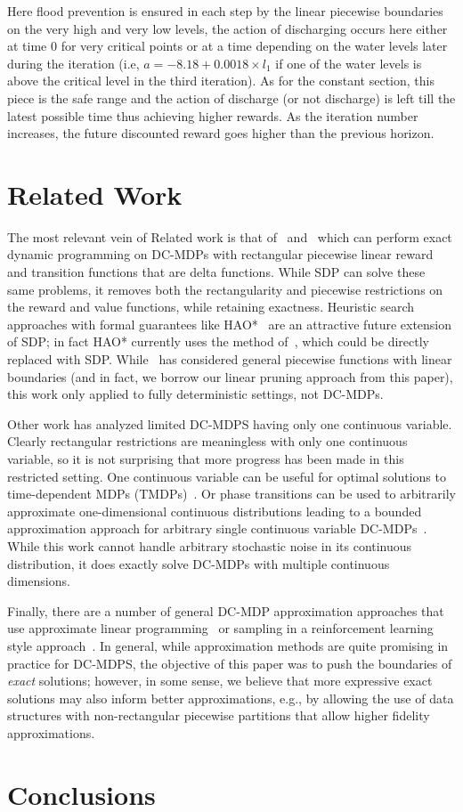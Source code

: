\documentclass[letterpaper]{article}
\begin{document}
Here flood prevention is ensured in each step by the linear piecewise
boundaries on the very high and very low levels, the action of discharging
occurs here either at time 0 for very critical points or at a time depending
on the water levels later during the iteration (i.e, $a = -8.18 +
0.0018\times l_1$ if one of the water levels is above the critical level in
the third iteration). As for the constant section, this piece is the safe
range and the action of discharge (or not discharge) is left till the latest
possible time thus achieving higher rewards. As the iteration number
increases, the future discounted reward goes higher than the previous
horizon.

\section{Related Work}
The most relevant vein of Related work is that of~\cite{feng04}
and~\cite{li05} which can perform exact dynamic programming on
DC-MDPs with rectangular piecewise linear reward and transition functions
that are delta functions.  While SDP can solve these same problems,
it removes both the rectangularity and piecewise restrictions on the
reward and value functions, while
retaining exactness.  
Heuristic search approaches with formal guarantees 
like HAO*~\cite{hao09} are an attractive future extension of SDP;
in fact HAO* currently uses the method of~\cite{feng04}, which could
be directly replaced with SDP.  While~\cite{penberthy94} has considered
general piecewise functions with linear boundaries (and in fact,
we borrow our linear pruning approach from this paper), this work
only applied to fully deterministic settings, not DC-MDPs.

Other work has analyzed limited DC-MDPS having only one continuous
variable.  Clearly rectangular restrictions are meaningless with
only one continuous variable, so it is not surprising that more
progress has been made in this restricted setting.  One continuous
variable can be useful for optimal solutions to time-dependent MDPs 
(TMDPs)~\cite{boyan01}.  Or phase transitions can be used to 
arbitrarily approximate one-dimensional continuous distributions
leading to a bounded approximation approach for arbitrary single continuous
variable DC-MDPs~\cite{phase07}.  
While this work cannot handle arbitrary stochastic
noise in its continuous distribution, it does exactly solve DC-MDPs
with multiple continuous dimensions.

Finally, there are a number of general DC-MDP approximation
approaches that use approximate linear programming~\cite{kveton06}
or sampling in a reinforcement learning style approach~\cite{munos02}.
In general, while approximation methods are quite promising in
practice for DC-MDPS, the objective of this paper was to push
the boundaries of \emph{exact} solutions; however, in some sense, 
we believe that more expressive exact solutions may also inform
better approximations, e.g., by allowing the use of data structures
with non-rectangular piecewise partitions that allow higher fidelity
approximations.

\section{Conclusions}




\end{document}
